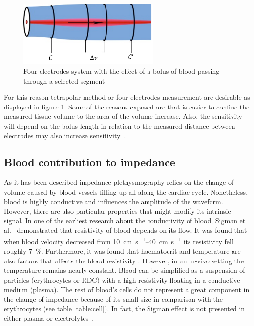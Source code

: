 \begin{figure}[!htpb]
	\centering
	\includegraphics[width=7cm,keepaspectratio]{figure6}    
	\caption[Four electrodes placement for iPG]{Four electrodes system with the effect of a bolus of blood passing through a selected segment}
	\label{fig:cylinder bolus}
\end{figure}

For this reason tetrapolar method or four electrodes measurement are desirable as displayed in figure \ref{fig:cylinder bolus}. Some of the reasons exposed are that is easier to confine the measured tissue volume to the area of the volume increase. Also, the sensitivity will depend on the bolus length in relation to the measured distance between electrodes may also increase sensitivity~\cite{porter1985measurement}.


\subsection{Blood contribution to impedance} %
As it has been described impedance plethysmography relies on the change of volume caused by blood vessels filling up all along the cardiac cycle. Nonetheless, blood is highly conductive and influences the amplitude of the waveform. However, there are also particular properties that might modify its intrinsic signal. In one of the earliest research about the conductivity of blood, Sigman et al.~\cite{sigman1937effect} demonstrated that resistivity of blood depends on its flow. It was found that when blood velocity decreased from \SIrange{10}{40}{\centi\meter\per\second} its resistivity fell roughly \SI{7}{\percent}. Furthermore, it was found that haematocrit and temperature are also factors that affects the blood resistivity \cite{yamakoshi1980noninvasive}. However, in an in-vivo setting the temperature remains nearly constant. Blood can be simplified as a suspension of particles (erythrocytes or RDC) with a high resistivity floating in a conductive medium (plasma). The rest of blood’s cells do not represent a great component in the change of impedance because of its small size in comparison with the erythrocytes (see table \ref{table:cell}). In fact, the Sigman effect is not presented in either plasma or electrolytes~\cite{tremper1990principles}.  

